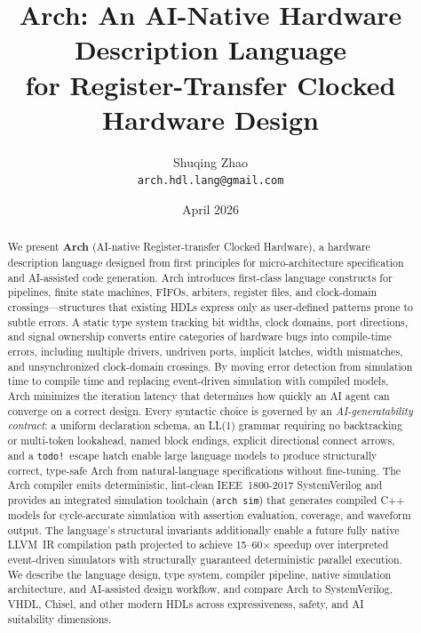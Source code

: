 \documentclass[11pt,twocolumn]{article}
\title{\textbf{Arch: An AI-Native Hardware Description Language\\for Register-Transfer Clocked Hardware Design}}
\author{
  Shuqing Zhao \\
  \texttt{arch.hdl.lang@gmail.com}
}
\date{April 2026}
\begin{document}
\maketitle

\begin{abstract}
We present \textbf{Arch} (AI-native Register-transfer Clocked Hardware), a hardware description language designed from first principles for micro-architecture specification and AI-assisted code generation.
Arch introduces first-class language constructs for pipelines, finite state machines, FIFOs, arbiters, register files, and clock-domain crossings---structures that existing HDLs express only as user-defined patterns prone to subtle errors.
A static type system tracking bit widths, clock domains, port directions, and signal ownership converts entire categories of hardware bugs into compile-time errors, including multiple drivers, undriven ports, implicit latches, width mismatches, and unsynchronized clock-domain crossings.
By moving error detection from simulation time to compile time and replacing event-driven simulation with compiled models, Arch minimizes the iteration latency that determines how quickly an AI agent can converge on a correct design.
Every syntactic choice is governed by an \emph{AI-generatability contract}: a uniform declaration schema, an LL(1) grammar requiring no backtracking or multi-token lookahead, named block endings, explicit directional connect arrows, and a \texttt{todo!}\ escape hatch enable large language models to produce structurally correct, type-safe Arch from natural-language specifications without fine-tuning.
The Arch compiler emits deterministic, lint-clean IEEE~1800-2017 SystemVerilog and provides an integrated simulation toolchain (\texttt{arch sim}) that generates compiled C++ models for cycle-accurate simulation with assertion evaluation, coverage, and waveform output.
The language's structural invariants additionally enable a future fully native LLVM~IR compilation path projected to achieve 15--60$\times$ speedup over interpreted event-driven simulators with structurally guaranteed deterministic parallel execution.
We describe the language design, type system, compiler pipeline, native simulation architecture, and AI-assisted design workflow, and compare Arch to SystemVerilog, VHDL, Chisel, and other modern HDLs across expressiveness, safety, and AI suitability dimensions.
\end{abstract}
\end{document}
